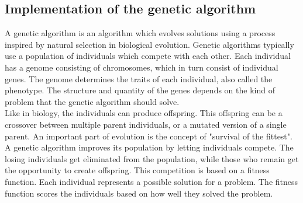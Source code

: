 
\subsection{Implementation of the genetic algorithm}
A genetic algorithm is an algorithm which evolves solutions using a process inspired by natural selection in biological evolution. Genetic algorithms typically use a population of individuals which compete with each other. Each individual has a genome consisting of chromosomes, which in turn consist of individual genes. The genome determines the traits of each individual, also called the phenotype. The structure and quantity of the genes depends on the kind of problem that the genetic algorithm should solve. \\
Like in biology, the individuals can produce offspring. This offspring can be a crossover between multiple parent individuals, or a mutated version of a single parent. An important part of evolution is the concept of "survival of the fittest". A genetic algorithm improves its population by letting individuals compete. The losing individuals get eliminated from the population, while those who remain get the opportunity to create offspring. This competition is based on a fitness function. Each individual represents a possible solution for a problem. The fitness function scores the individuals based on how well they solved the problem.

